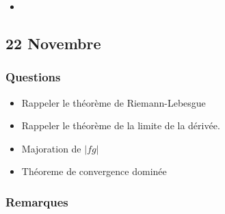 \documentclass[a4paper, 11pt, hidelinks]{article}
\begin{document}
\begin{itemize}
    \item 
\end{itemize}



\subsection{22 Novembre}




\subsubsection{Questions}


\begin{itemize}
    \item Rappeler le théorème de Riemann-Lebesgue
    \item Rappeler le théorème de la limite de la dérivée.
    \item Majoration de $|fg|$
    \item Théoreme de convergence dominée
\end{itemize}


\subsubsection{Remarques}
\end{document}
